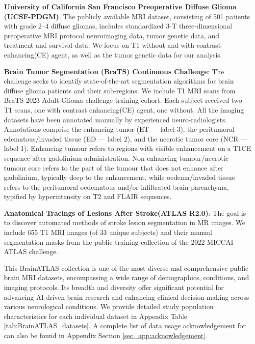 \documentclass[pdflatex,sn-nature]{sn-jnl}%
\theoremstyle{thmstyleone}%
\theoremstyle{thmstyletwo}%
\theoremstyle{thmstylethree}%
\begin{document}
\begin{appendices}
\textbf{University of California San Francisco Preoperative Diffuse Glioma (UCSF-PDGM)}\citep{calabrese2022university}. The publicly available MRI dataset, consisting of 501 patients with grade 2–4 diffuse gliomas, includes standardized 3-T three-dimensional preoperative MRI protocol neuroimaging data, tumor genetic data, and treatment and survival data. We focus on T1 without and with contrast enhancing(CE) agent, as well as the tumor genetic data for our analysis.


\textbf{Brain Tumor Segmentation (BraTS) Continuous Challenge}\citep{baid2021rsna, menze2014multimodal, bakas2017advancing}: The challenge seeks to identify state-of-the-art segmentation algorithms for brain diffuse glioma patients and their sub-regions. We include T1 MRI scans from BraTS 2023 Adult Glioma challenge training cohort. Each subject received two T1 scans, one with contrast enhancing(CE) agent, one without. All the imaging datasets have been annotated manually by experienced neuro-radiologists. Annotations comprise the enhancing tumor (ET — label 3), the peritumoral edematous/invaded tissue (ED — label 2), and the necrotic tumor core (NCR — label 1). Enhancing tumour refers to regions with visible enhancement on a T1CE sequence after gadolinium administration. Non-enhancing tumour/necrotic tumour core refers to the part of the tumour that does not enhance after gadolinium, typically deep to the enhancement, while oedema/invaded tissue refers to the peritumoral oedematous and/or infiltrated brain parenchyma, typified by hyperintensity on T2 and FLAIR sequences.

\textbf{Anatomical Tracings of Lesions After Stroke(ATLAS R2.0)}\citep{liew2022large}: The goal is to discover automated methods of stroke lesion segmentation in MR images. We include 655 T1 MRI images (of 33 unique subjects) and their manual segmentation masks from the public training collection of the 2022 MICCAI ATLAS challenge. 

This BrainATLAS collection is one of the most diverse and comprehensive public brain MRI datasets, encompassing a wide range of demographics, conditions, and imaging protocols. Its breadth and diversity offer significant potential for advancing AI-driven brain research and enhancing clinical decision-making across various neurological conditions. We provide detailed study population characteristics for each individual dataset in Appendix Table \ref{tab:BrainATLAS_datasets}. A complete list of data usage acknowledgement for can also be found in Appendix Section \ref{sec_app:acknowledgement}. 


\end{appendices}
\end{document}
